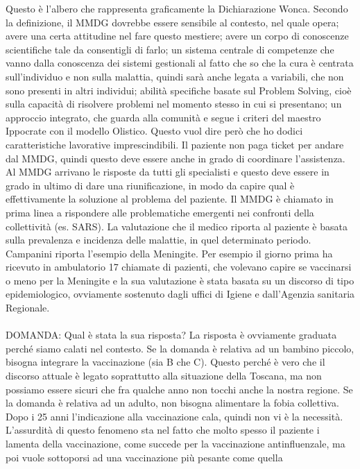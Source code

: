 Questo è l'albero che rappresenta graficamente la Dichiarazione Wonca.
Secondo la definizione, il MMDG dovrebbe essere sensibile al contesto,
nel quale opera; avere una certa attitudine nel fare questo mestiere;
avere un corpo di conoscenze scientifiche tale da consentigli di farlo;
un sistema centrale di competenze che vanno dalla conoscenza dei sistemi
gestionali al fatto che so che la cura è centrata sull'individuo e non
sulla malattia, quindi sarà anche legata a variabili, che non sono
presenti in altri individui; abilità specifiche basate sul Problem
Solving, cioè sulla capacità di risolvere problemi nel momento stesso in
cui si presentano; un approccio integrato, che guarda alla comunità e
segue i criteri del maestro Ippocrate con il modello Olistico. Questo
vuol dire però che ho dodici caratteristiche lavorative imprescindibili.
Il paziente non paga ticket per andare dal MMDG, quindi questo deve
essere anche in grado di coordinare l'assistenza. Al MMDG arrivano le
risposte da tutti gli specialisti e questo deve essere in grado in
ultimo di dare una riunificazione, in modo da capire qual è
effettivamente la soluzione al problema del paziente. Il MMDG è chiamato
in prima linea a rispondere alle problematiche emergenti nei confronti
della collettività (es. SARS). La valutazione che il medico riporta al
paziente è basata sulla prevalenza e incidenza delle malattie, in quel
determinato periodo. Campanini riporta l'esempio della Meningite. Per
esempio il giorno prima ha ricevuto in ambulatorio 17 chiamate di
pazienti, che volevano capire se vaccinarsi o meno per la Meningite e la
sua valutazione è stata basata su un discorso di tipo epidemiologico,
ovviamente sostenuto dagli uffici di Igiene e dall'Agenzia sanitaria
Regionale.
\\\\
DOMANDA: Qual è stata la sua risposta? La risposta è ovviamente graduata
perché siamo calati nel contesto. Se la domanda è relativa ad un bambino
piccolo, bisogna integrare la vaccinazione (sia B che C). Questo perché
è vero che il discorso attuale è legato soprattutto alla situazione
della Toscana, ma non possiamo essere sicuri che fra qualche anno non
tocchi anche la nostra regione. Se la domanda è relativa ad un adulto,
non bisogna alimentare la fobia collettiva. Dopo i 25 anni l'indicazione
alla vaccinazione cala, quindi non vi è la necessità. L'assurdità di
questo fenomeno sta nel fatto che molto spesso il paziente i lamenta
della vaccinazione, come succede per la vaccinazione antinfluenzale, ma
poi vuole sottoporsi ad una vaccinazione più pesante come quella
